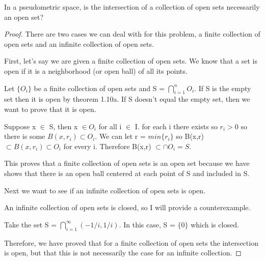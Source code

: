 \setcounter{question}{12} %
\begin{question}[Golinski]
  In a pseudometric space, is the intersection of a collection of open sets necessarily an open set?
\end{question}

\begin{proof}

There are two cases we can deal with for this problem, a finite collection of open sets and an infinite collection of open sets.

\bigskip

First, let's say we are given a finite collection of open sets. We know that a set is open if it is a neighborhood (or open ball) of all its points.

Let $\{O_i\}$ be a finite collection of open sets and S = $\bigcap_{i=1}^{n} O_i$. If S is the empty set then it is open by theorem 1.10a. If S doesn't equal the empty set, then we want to prove that it is open.

Suppose x $\in$ S, then x $\in O_i$ for all i $\in$ I. for each i there exists so $r_i > 0$ so there is some $B(x, r_i) \subset O_i$. We can let r = $min\{r_i\}$ so B(x,r) $\subset B(x,r_i) \subset O_i$ for every i. Therefore B(x,r) $\subset \cap O_i = S$.

This proves that a finite collection of open sets is an open set because we have shows that there is an open ball centered at each point of S and included in S.

\bigskip

Next we want to see if an infinite collection of open sets is open.

An infinite collection of open sets is closed, so I will provide a counterexample.

Take the set S = $\bigcap_{i=1}^\infty (-1/i, 1/i)$. In this case, S = $\{0\}$ which is closed. 

\bigskip

Therefore, we have proved that for a finite collection of open sets the intersection is open, but that this is not necessarily the case for an infinite collection.
\end{proof}
	
